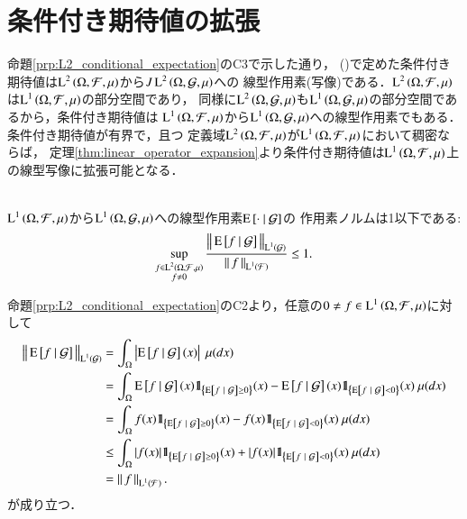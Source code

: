 	
\section{条件付き期待値の拡張}
	命題\ref{prp:L2_conditional_expectation}のC3で示した通り，
	()で定めた条件付き期待値は$\operatorname{L}^{2} \left(\Omega,\mathcal{F},\mu\right)$から$J\operatorname{L}^{2} \left(\Omega,\mathcal{G},\mu\right)$への
	線型作用素(写像)である．$\operatorname{L}^{2} \left(\Omega,\mathcal{F},\mu\right)$は$\operatorname{L}^{1} \left(\Omega,\mathcal{F},\mu\right)$の部分空間であり，
	同様に$\operatorname{L}^{2} \left(\Omega,\mathcal{G},\mu\right)$も$\operatorname{L}^{1} \left(\Omega,\mathcal{G},\mu\right)$の部分空間であるから，条件付き期待値は
	$\operatorname{L}^{1} \left(\Omega,\mathcal{F},\mu\right)$から$\operatorname{L}^{1} \left(\Omega,\mathcal{G},\mu\right)$への線型作用素でもある．
	条件付き期待値が有界で，且つ
	定義域$\operatorname{L}^{2} \left(\Omega,\mathcal{F},\mu\right)$が$\operatorname{L}^{1} \left(\Omega,\mathcal{F},\mu\right)$において稠密ならば，
	定理\ref{thm:linear_operator_expansion}より条件付き期待値は$\operatorname{L}^{1} \left(\Omega,\mathcal{F},\mu\right)$上の線型写像に拡張可能となる．
	
	\begin{screen}
		\begin{lem}[条件付き期待値の有界性]\mbox{}\\
			$\operatorname{L}^{1} \left(\Omega,\mathcal{F},\mu\right)$から$\operatorname{L}^{1} \left(\Omega,\mathcal{G},\mu\right)$への線型作用素$\operatorname{E} \left[ \cdot \ \middle|\ \mathcal{G} \right]$の
			作用素ノルムは1以下である:
			\begin{align}
				\operatorname*{sup}_{\substack{f \in \operatorname{L}^{2} \left(\Omega,\mathcal{F},\mu\right) \\ f \neq 0}} \frac{ \left\|\, \operatorname{E} \left[ f \ \middle|\ \mathcal{G} \right]\, \right\|_{\operatorname{L}^{1} \left(\mathcal{G}\right)} }{ \left\|\, f\, \right\|_{\operatorname{L}^{1} \left(\mathcal{F}\right)} } \leq 1.
			\end{align}
			\label{lem:conditional_exp_bound}
		\end{lem}
	\end{screen}
	
	\begin{prf}
		命題\ref{prp:L2_conditional_expectation}のC2より，任意の$0 \neq f \in \operatorname{L}^{1} \left(\Omega,\mathcal{F},\mu\right)$に対して
		\begin{align}
			\Norm{\cexp{f}{\mathcal{G}}}{\Lp{1}{\mathcal{G}}} 
			&= \int_\Omega \left| \cexp{f}{\mathcal{G}}(x) \right|\ \mu(dx) \\
			&= \int_\Omega \cexp{f}{\mathcal{G}}(x) \defunc_{\left\{ \cexp{f}{\mathcal{G}} \geq 0\right \}}(x) 
				- \cexp{f}{\mathcal{G}}(x) \defunc_{\left\{ \cexp{f}{\mathcal{G}} < 0\right\} }(x)\ \mu(dx) \\
			&= \int_\Omega f(x) \defunc_{\left\{ \cexp{f}{\mathcal{G}} \geq 0\right\} }(x) - f(x) \defunc_{\left\{ \cexp{f}{\mathcal{G}} < 0\right\} }(x)\ \mu(dx) \\
			&\leq \int_\Omega |f(x)| \defunc_{\left\{ \cexp{f}{\mathcal{G}} \geq 0\right\} }(x) + |f(x)| \defunc_{\left\{ \cexp{f}{\mathcal{G}} < 0\right\} }(x)\ \mu(dx) \\
			&= \Norm{f}{\Lp{1}{\mathcal{F}}}.
		\end{align}
		が成り立つ．
		\QED
	\end{prf}
	
